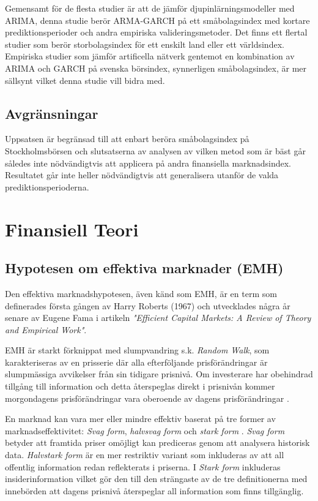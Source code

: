 \documentclass[11pt]{article}
\numberwithin{equation}{section}
\numberwithin{table}{section}
\numberwithin{figure}{section}
\begin{document}
Gemensamt för de flesta studier är att de jämför djupinlärningsmodeller med ARIMA, denna studie berör ARMA-GARCH på ett småbolagsindex med kortare prediktionsperioder och andra empiriska valideringsmetoder. Det finns ett flertal studier som berör storbolagsindex för ett enskilt land eller ett världsindex. Empiriska studier som jämför artificella nätverk gentemot en kombination av ARIMA och GARCH på svenska börsindex, synnerligen småbolagsindex, är mer sällsynt vilket denna studie vill bidra med. 

 
\subsection{Avgränsningar}
Uppsatsen är begränsad till att enbart beröra småbolagsindex på Stockholmsbörsen och slutsatserna av analysen av vilken metod som är bäst går således inte nödvändigtvis att applicera på andra finansiella marknadsindex. Resultatet går inte heller nödvändigtvis att generalisera utanför de valda prediktionsperioderna.

\newpage
\section{Finansiell Teori}

\subsection{Hypotesen om effektiva marknader (EMH)}
Den effektiva marknadshypotesen, även känd som EMH, är en term som definerades första gången av Harry Roberts (1967) och utvecklades några år senare av Eugene Fama \parencite*{Fama1970} i artikeln \emph{"Efficient Capital Markets: A Review of Theory and Empirical Work"}. 

EMH är starkt förknippat med slumpvandring s.k. \emph{Random Walk}, som karakteriseras av en prisserie där alla efterföljande prisförändringar är slumpmässiga avvikelser från sin tidigare prisnivå. Om investerare har obehindrad tillgång till information och detta återspeglas direkt i prisnivån kommer morgondagens prisförändringar vara oberoende av dagens prisförändringar \parencite{EMH}. 

En marknad kan vara mer eller mindre effektiv baserat på tre former av marknadseffektivitet: \emph{Svag form}, \emph{halvsvag form} och \emph{stark form} \parencite{Fama1970}. \emph{Svag form} betyder att framtida priser omöjligt kan prediceras genom att analysera historisk data. \emph{Halvstark form} är en mer restriktiv variant som inkluderas av att all offentlig information redan reflekterats i priserna. I \emph{Stark form} inkluderas insiderinformation vilket gör den till den strängaste av de tre definitionerna med innebörden att dagens prisnivå återspeglar all information som finns tillgänglig.
\end{document}
